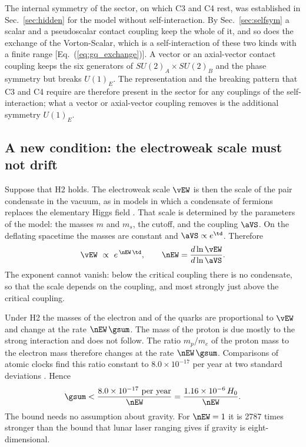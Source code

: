 The internal symmetry of the sector, on which C3 and C4 rest, was established in
Sec.~\ref{sec:hidden} for the model without self-interaction. By Sec.~\ref{sec:selfsym} a scalar
and a pseudoscalar contact coupling keep the whole of it, and so does the exchange of the
Vorton-Scalar, which is a self-interaction of these two kinds with a finite range
[Eq.~(\ref{eq:gq_exchange})]. A vector or an axial-vector contact coupling keeps the six generators
of $SU(2)_A\times SU(2)_B$ and the phase symmetry but breaks $U(1)_E$. The representation and the
breaking pattern that C3 and C4 require are therefore present in the sector for any couplings of the
self-interaction; what a vector or axial-vector coupling removes is the additional symmetry
$U(1)_E$.

\subsection{A new condition: the electroweak scale must not drift}

Suppose that H2 holds. The electroweak scale $\vEW$ is then the scale of the pair condensate in the
vacuum, as in models in which a condensate of fermions replaces the elementary Higgs field
\cite{BardeenHillLindner1990}. That scale is determined by the parameters of the model: the masses
$m$ and $m_s$, the cutoff, and the coupling $\aVS$. On the deflating spacetime the masses are constant
and $\aVS\propto e^{\td}$. Therefore
\begin{equation}
\vEW\ \propto\ e^{\,\nEW\,\td},\qquad\nEW=\frac{d\ln\vEW}{d\ln\aVS}.
\label{eq:nEW}
\end{equation}
The exponent cannot vanish: below the critical coupling there is no condensate, so that the scale
depends on the coupling, and most strongly just above the critical coupling.

Under H2 the masses of the electron and of the quarks are proportional to $\vEW$ and change at the
rate $\nEW\,\gsum$. The mass of the proton is due mostly to the strong interaction and does not
follow. The ratio $m_p/m_e$ of the proton mass to the electron mass therefore changes at the rate
$\nEW\,\gsum$. Comparisons of atomic clocks find this ratio constant to $8.0\times10^{-17}$ per year
at two standard deviations \cite{Lange2021}. Hence
\begin{equation}
\gsum<\frac{8.0\times10^{-17}\ \text{per year}}{\nEW}=\frac{1.16\times10^{-6}\,H_0}{\nEW}.
\label{eq:clockbound}
\end{equation}
The bound needs no assumption about gravity. For $\nEW=1$ it is 2787 times stronger than the bound
that lunar laser ranging gives if gravity is eight-dimensional.

